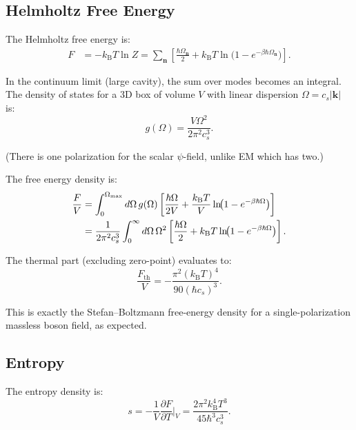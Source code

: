 \documentclass[aps,prd,twocolumn,showpacs,preprintnumbers,superscriptaddress,nofootinbib]{revtex4-2}
\newcommand{\kB}{k_{\mathrm{B}}}
\begin{document}
\subsection{Helmholtz Free Energy}\label{sec:free-energy}

The Helmholtz free energy is:
\begin{align}\label{eq:F}
F &= -\kB T \ln Z = \sum_{\mathbf{n}}\left[
  \frac{\hbar\Omega_{\mathbf{n}}}{2}
  + \kB T\ln\!\bigl(1 - e^{-\beta\hbar\Omega_{\mathbf{n}}}\bigr)
\right].
\end{align}

In the continuum limit (large cavity), the sum over modes becomes an
integral.  The density of states for a 3D box of volume $V$ with linear
dispersion $\Omega = c_s|\mathbf{k}|$ is:
\begin{equation}\label{eq:dos}
g(\Omega) = \frac{V\Omega^2}{2\pi^2 c_s^3}.
\end{equation}

(There is one polarization for the scalar $\psi$-field, unlike EM which
has two.)

The free energy density is:
\begin{align}\label{eq:f-density}
\frac{F}{V} &= \int_0^{\Omega_{\max}} d\Omega\,g(\Omega)\left[
  \frac{\hbar\Omega}{2V}
  + \frac{\kB T}{V}\ln\!\bigl(1 - e^{-\beta\hbar\Omega}\bigr)
\right] \notag\\
&= \frac{1}{2\pi^2 c_s^3}\int_0^{\infty} d\Omega\,\Omega^2\left[
  \frac{\hbar\Omega}{2}
  + \kB T\ln\!\bigl(1 - e^{-\beta\hbar\Omega}\bigr)
\right].
\end{align}

The thermal part (excluding zero-point) evaluates to:
\begin{equation}\label{eq:f-thermal}
\frac{F_{\mathrm{th}}}{V} = -\frac{\pi^2(\kB T)^4}{90(\hbar c_s)^3}.
\end{equation}

This is exactly the Stefan--Boltzmann free-energy density for a
single-polarization massless boson field, as expected.

\subsection{Entropy}\label{sec:entropy}

The entropy density is:
\begin{equation}\label{eq:entropy}
s = -\frac{1}{V}\frac{\partial F}{\partial T}\biggr|_V
  = \frac{2\pi^2 \kB^4 T^3}{45 \hbar^3 c_s^3}.
\end{equation}
\end{document}
